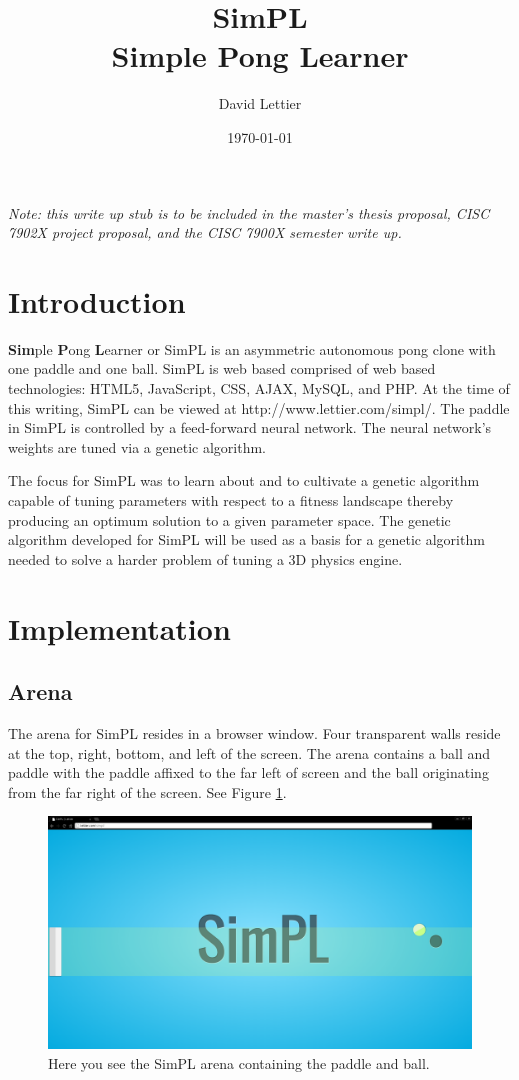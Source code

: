 \documentclass[a4paper,10pt]{article}
\title{SimPL \\ Simple Pong Learner}
\author{David Lettier}
\date{\today}
\begin{document}
\maketitle

\textit{Note: this write up stub is to be included in the master's thesis proposal, CISC 7902X project proposal, and the CISC 7900X semester write up.}

\section{Introduction}

\textbf{Sim}ple \textbf{P}ong \textbf{L}earner or SimPL is an asymmetric autonomous pong clone with one paddle and one ball. SimPL is web based comprised of web based technologies: HTML5, JavaScript, CSS, AJAX, MySQL, and PHP. At the time of this writing, SimPL can be viewed at http://www.lettier.com/simpl/. The paddle in SimPL is controlled by a feed-forward neural network. The neural network's weights are tuned via a genetic algorithm. 

The focus for SimPL was to learn about and to cultivate a genetic algorithm capable of tuning parameters with respect to a fitness landscape thereby producing an optimum solution to a given parameter space. The genetic algorithm developed for SimPL will be used as a basis for a genetic algorithm needed to solve a harder problem of tuning a 3D physics engine. 

\section{Implementation}

\subsection{Arena}

The arena for SimPL resides in a browser window. Four transparent walls reside at the top, right, bottom, and left of the screen. The arena contains a ball and paddle with the paddle affixed to the far left of screen and the ball originating from the far right of the screen. See Figure \ref{fig:arena}.

\begin{figure}[H]  
  \centering
  \includegraphics[width=.9\textwidth]{figures/arena.png}
  \caption{Here you see the SimPL arena containing the paddle and ball.}
  \label{fig:arena}
\end{figure}
\end{document}
